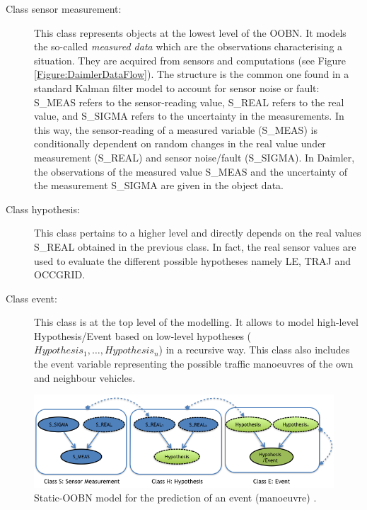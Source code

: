 \begin{description}
\item[Class sensor measurement:]  This class represents objects at the lowest level of the OOBN. It models the so-called \textit{measured data} which are  the observations characterising a situation. They are acquired from sensors and computations (see Figure \ref{Figure:DaimlerDataFlow}). The structure is the common one found in a standard Kalman filter model to account for sensor noise or fault: S\_MEAS refers to the sensor-reading value, S\_REAL refers to the real value, and S\_SIGMA refers to the uncertainty in the measurements. In this way, the sensor-reading of a measured variable (S\_MEAS) is conditionally dependent on random changes in the real value under measurement (S\_REAL) and sensor noise/fault (S\_SIGMA). In Daimler, the observations of the measured value S\_MEAS and the uncertainty of the measurement S\_SIGMA are given in the object data. 

\item[Class hypothesis:] This class pertains to a higher level and directly depends on the real values S\_REAL obtained in the previous class. In fact, the real sensor values are used to evaluate the different possible hypotheses namely LE, TRAJ and OCCGRID. 

\item[Class event:] This class is at the top level of the modelling. It allows to model high-level Hypothesis/Event based on low-level hypotheses ($Hypothesis_1, \ldots, Hypothesis_n$) in a recursive way. This class also includes the event variable representing the possible traffic manoeuvres of the own and neighbour vehicles. 
\end{description}

\begin{figure}[ht!]
\begin{center}
\includegraphics[scale=0.58]{./figures/DaimlerOOBNAbstraction}
\caption{\label{Figure:DaimlerOOBNAbstraction} Static-OOBN model for the prediction of an event (manoeuvre) \cite{Weidl2014}.}
\end{center}
\end{figure}

